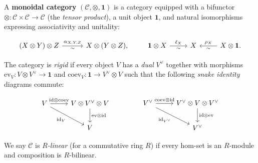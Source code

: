 \begin{definition}
  \label{def:rigid-monoidal-category}
A \textbf{monoidal category} $(\mathcal{C}, \otimes, \mathbf{1})$ is a
category equipped with a bifunctor
$\otimes \colon \mathcal{C} \times \mathcal{C} \to \mathcal{C}$ (the
\emph{tensor product}), a unit object $\mathbf{1}$, and natural
isomorphisms expressing associativity and unitality:

\[
\begin{tikzcd}[column sep=3em]
  (X \otimes Y) \otimes Z
    \ar[r, "\alpha_{X,Y,Z}", "\sim"']
  & X \otimes (Y \otimes Z),
\end{tikzcd}
\qquad
\begin{tikzcd}[column sep=2.5em]
  \mathbf{1} \otimes X
    \ar[r, "\ell_X", "\sim"']
  & X
  & X \otimes \mathbf{1}.
    \ar[l, "\rho_X"', "\sim"]
\end{tikzcd}
\]

The category is \emph{rigid} if every object $V$ has a \emph{dual}
$V^{\vee}$ together with morphisms
$\mathrm{ev}_V \colon V \otimes V^{\vee} \to \mathbf{1}$
and
$\mathrm{coev}_V \colon \mathbf{1} \to V^{\vee} \otimes V$
such that the following \emph{snake identity} diagrams commute:

\begin{equation}\label{eq:snake-identities}
\begin{tikzcd}[row sep=2em, column sep=2.5em]
  V
    \ar[r, "\mathrm{id} \otimes \mathrm{coev}"]
    \ar[dr, "\mathrm{id}_V"']
  & V \otimes V^{\vee} \otimes V
    \ar[d, "\mathrm{ev} \otimes \mathrm{id}"]
  \\
  & V
\end{tikzcd}
\qquad\qquad
\begin{tikzcd}[row sep=2em, column sep=2.5em]
  V^{\vee}
    \ar[r, "\mathrm{coev} \otimes \mathrm{id}"]
    \ar[dr, "\mathrm{id}_{V^{\vee}}"']
  & V^{\vee} \otimes V \otimes V^{\vee}
    \ar[d, "\mathrm{id} \otimes \mathrm{ev}"]
  \\
  & V^{\vee}
\end{tikzcd}
\end{equation}

We say $\mathcal{C}$ is \emph{$R$-linear} (for a commutative ring $R$)
if every hom-set is an $R$-module and composition is $R$-bilinear.
\end{definition}

